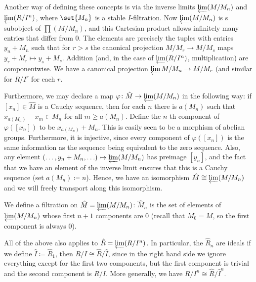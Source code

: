 Another way of defining these concepts is via the inverse limits
$\varprojlim (M/M_n)$ and $\varprojlim (R/I^n)$, where $\set{M_n}$ is a stable
$I$-filtration. Now $\varprojlim (M/M_n)$ is s subobject of $\prod (M/M_n)$,
and this Cartesian product allows infinitely many entries that differ from
$0$. The elements are precisely the tuples with entries $y_n + M_n$ such that
for $r>s $ the canonical projection $M/M_r\to M/M_s$ maps
$y_r + M_r\mapsto y_s + M_s$. Addition (and, in the case of $\varprojlim (R/I^n)$,
multiplication) are componentwise. We have a canonical projection
$\varprojlim M/M_n\to M/M_r$ (and similar for $R/I^r$ for each $r$.

Furthermore, we may declare a map $\varphi\colon \hat{M} \to \varprojlim (M/M_n)$ in the following
way: if $[x_n] \in \hat{M}$ is a Cauchy sequence, then for each $n$ there is
 $a(M_n)$ such that $x_{a(M_n)} - x_m \in M_n$ for all $m\geq a(M_n)$. Define the
 $n$-th component of $\varphi([x_n])$ to be $x_{a(M_n)} + M_n$. This is easily
 seen to be a morphism of abelian groups. Furthermore, it is injective, since
every component of $\varphi([x_n])$ is the same information as the sequence being
equivalent to the zero sequence. Also, any element
$(\ldots, y_n + M_n, \ldots) \mapsto \varprojlim (M/M_n)$ has preimage
$[y_n]$, and the fact that we have an element of the inverse limit ensures that
this is a Cauchy sequence (set $a(M_n)\coloneqq n$). Hence, we have an isomorphism
$\hat{M}\cong \varprojlim (M/M_n)$ and we will freely transport along this isomorphism.

We define a filtration on $\hat{M} = \varprojlim (M/M_n)$: $\hat{M}_n$ is the
set of elements of $\varprojlim (M/M_n)$ whose first $n+1$ components are $0$
(recall that $M_0 = M$, so the first component is always $0$).

All of the above also applies to $\hat{R} = \varprojlim (R/I^n)$. In particular,
the $\hat{R}_n$ are ideals if we define $\hat{I}\coloneqq \hat{R}_1$, then
$R/I \cong \hat{R}/\hat{I}$, since in the right hand side we ignore everything
except for the first two components, but the first component is trivial and
the second component is $R/I$. More generally, we have $R/I^n \cong \hat{R}/\hat{I}^n$.
